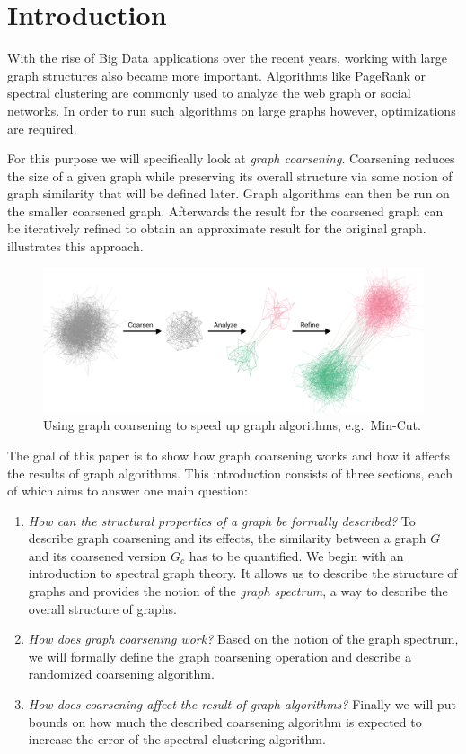 \section{Introduction}%
\label{sec:intro}

\setcounter{page}{1}			%

With the rise of Big Data applications over the recent years, working with large graph structures also became more important.
Algorithms like PageRank or spectral clustering are commonly used to analyze the web graph or social networks.
In order to run such algorithms on large graphs however, optimizations are required.

For this purpose we will specifically look at \textit{graph coarsening}.
Coarsening reduces the size of a given graph while preserving its overall structure via some notion of graph similarity that will be defined later.
Graph algorithms can then be run on the smaller coarsened graph.
Afterwards the result for the coarsened graph can be iteratively refined to obtain an approximate result for the original graph.
 illustrates this approach.
\begin{figure}[ht]
	\centering
	\includegraphics[width=0.8\linewidth]{gfx/intro/overview.pdf}
	\caption{%
		Using graph coarsening to speed up graph algorithms, e.g.\  Min-Cut.
	}\label{fig:intro:overview}
\end{figure}

The goal of this paper is to show how graph coarsening works and how it affects the results of graph algorithms.
This introduction consists of three sections, each of which aims to answer one main question:
\begin{enumerate}
	\item \textit{How can the structural properties of a graph be formally described?}
		To describe graph coarsening and its effects, the similarity between a graph $G$ and its coarsened version $G_c$ has to be quantified.
		We begin with an introduction to spectral graph theory.
		It allows us to describe the structure of graphs and provides the notion of the \textit{graph spectrum}, a way to describe the overall structure of graphs.
	\item \textit{How does graph coarsening work?}
		Based on the notion of the graph spectrum, we will formally define the graph coarsening operation and describe a randomized coarsening algorithm.
	\item \textit{How does coarsening affect the result of graph algorithms?}
		Finally we will put bounds on how much the described coarsening algorithm is expected to increase the error of the spectral clustering algorithm.
\end{enumerate}
